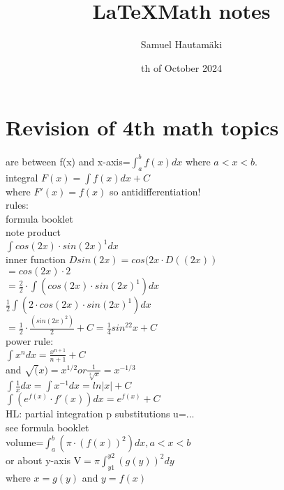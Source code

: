 \documentclass{article}
\title{\LaTeX Math notes}
\author{Samuel Hautamäki}
\date{th of October 2024}
\begin{document}
  \maketitle
   
  \section{Revision of 4th math topics}
  are between f(x) and x-axis=$\int_{a}^{b}f(x)dx$ where $a<x<b$.\\
  integral $F(x)=\int f(x)dx + C$\\
  where $F'(x)=f(x)$ so antidifferentiation!\\
  rules:\\
  formula booklet\\
  note product\\
  $\int cos(2x)\cdot sin(2x)^1dx$\\
  inner function $D sin(2x)=cos(2x\cdot D((2x))$\\
  $=cos(2x)\cdot 2$\\
  $=\frac{2}{2}\cdot\int (cos(2x)\cdot sin(2x)^1)dx$\\
  $\frac{1}{2}\int (2\cdot cos(2x)\cdot sin(2x)^1)dx$\\
  $=\frac{1}{2}\cdot\frac{(sin (2x)^2)}{2}+C=\frac{1}{4}sin^22x+C$\\
  power rule:\\
  $\int x^n dx=\frac{x^{n+1}}{n+1}+C$\\
  and $\sqrt(x)=x^{1/2} or \frac{1}{\sqrt[3]{x}}=x^{-1/3}$\\
  $\int \frac{1}{x}dx=\int x^{-1}dx=ln|x|+C$\\
  $\int(e^{f(x)}\cdot f'(x))dx=e^{f(x)}+C$\\
  HL: partial integration p substitutions u=...\\
  see formula booklet\\

  volume=$\int_{a}^{b}(\pi \cdot(f(x))^2)dx, a<x<b$\\
  or about y-axis V$=\pi\int_{y1}^{y2}(g(y))^2dy$\\
  where $x=g(y)$ and $y=f(x)$\\
\end{document}
